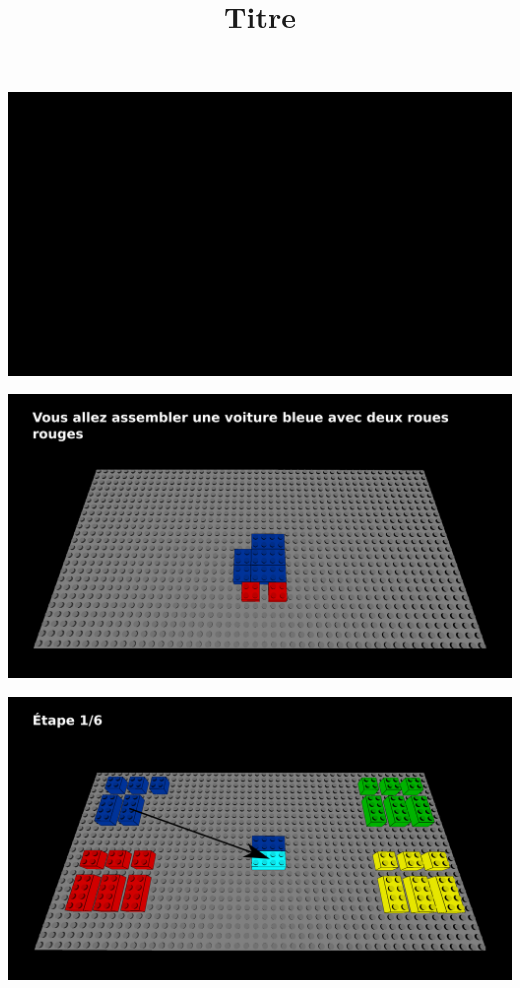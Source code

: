 \documentclass[aspectratio=169]{beamer}
\title{Titre}
\begin{document}
\begin{frame}
    \begin{center}
        \includegraphics[width=\linewidth]{void.png}
    \end{center}
\end{frame}

\begin{frame}
    \begin{center}
        \includegraphics[width=\linewidth]{figure.png}
    \end{center}
\end{frame}

\begin{frame}
  \includegraphics[width=\linewidth]{step1.png}
\end{frame}
\end{document}
